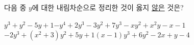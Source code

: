 다음 중 $y$에 대한 내림차순으로 정리한 것이 옳지 \underline{않은} 것은?
\begin{choicesv}{$y^3+y^2-5y+1$}{$-y^4+2y^3-3y^2+7$}{$y^3-xy^2+x^2y-x-1$}{$-2y^3+(x^2+3)y^2+5y+1$}{$(x-1)y^3+6y^2-2x+y-4$}\end{choicesv}
